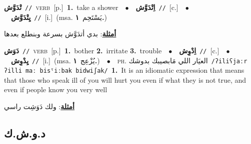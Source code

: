 \documentclass[10pt,a4paper,twoside]{article} %
\begin{document}
\begin{multicols}{2}
{\setlength\topsep{0pt}\textbf{\foreignlanguage{arabic}{تْدَوَّش}}\ {\color{gray}\texttt{//}\color{black}}\ \textsc{verb}\ [p.]\ \textbf{1.}~take a shower\ \ $\bullet$\ \ \setlength\topsep{0pt}\textbf{\foreignlanguage{arabic}{اِتْدَوَّش}}\ {\color{gray}\texttt{//}\color{black}}\ [c.]\ \ $\bullet$\ \ \setlength\topsep{0pt}\textbf{\foreignlanguage{arabic}{يِتْدَوَّش}}\ {\color{gray}\texttt{//}\color{black}}\ [i.]\ \color{gray}(msa. \foreignlanguage{arabic}{يَسْتَحِم}~\foreignlanguage{arabic}{\textbf{١.}})\color{black}\  \begin{flushright}\color{gray}\foreignlanguage{arabic}{\textbf{\underline{\foreignlanguage{arabic}{أمثلة}}}: بدي أتدَوَّش بسرعة وبنطلع بعدها}\end{flushright}\color{black}} \vspace{2mm}

{\setlength\topsep{0pt}\textbf{\foreignlanguage{arabic}{دَوَش}}\ {\color{gray}\texttt{//}\color{black}}\ \textsc{verb}\ [p.]\ \textbf{1.}~bother  \textbf{2.}~irritate  \textbf{3.}~trouble\ \ $\bullet$\ \ \setlength\topsep{0pt}\textbf{\foreignlanguage{arabic}{اِدْوِش}}\ {\color{gray}\texttt{//}\color{black}}\ [c.]\ \ $\bullet$\ \ \setlength\topsep{0pt}\textbf{\foreignlanguage{arabic}{يِدْوِش}}\ {\color{gray}\texttt{//}\color{black}}\ [i.]\ \color{gray}(msa. \foreignlanguage{arabic}{يُزْعِج}~\foreignlanguage{arabic}{\textbf{١.}})\color{black}\ \ $\bullet$\ \ \textsc{ph.} \color{gray} \foreignlanguage{arabic}{العيَار اللي مَابصيبك بدوشك}\color{black}\ {\color{gray}\texttt{/{\sffamily ʔiliʕjaːr ʔilli maː bisˤiːbak bidwiʃak}/}\color{black}}\ \textbf{1.}~It is an idiomatic expression that means that those who speak ill of you will hurt you even if what they is not true, and even if people know you very well\  \begin{flushright}\color{gray}\foreignlanguage{arabic}{\textbf{\underline{\foreignlanguage{arabic}{أمثلة}}}: ولك دَوَشِت راسي}\end{flushright}\color{black}} \vspace{2mm}

\vspace{-3mm}
\subsection*{\color{blue}\foreignlanguage{arabic}{د.و.ش.ك}\color{blue}{}} 


\end{multicols}
\end{document}

